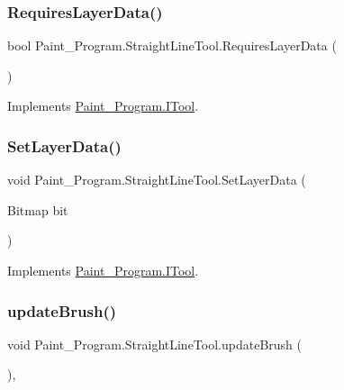 \subsubsection{\texorpdfstring{Requires\+Layer\+Data()}{RequiresLayerData()}}
{\footnotesize\ttfamily bool Paint\+\_\+\+Program.\+Straight\+Line\+Tool.\+Requires\+Layer\+Data (\begin{DoxyParamCaption}{ }\end{DoxyParamCaption})\hspace{0.3cm}{\ttfamily [inline]}}



Implements \mbox{\hyperlink{interface_paint___program_1_1_i_tool_a6d45b6c48da8130ae41db3a66cdaef9a}{Paint\+\_\+\+Program.\+I\+Tool}}.

\mbox{\label{class_paint___program_1_1_straight_line_tool_aaf03af3c789ac775fef1336c81c11a34}} 
\subsubsection{\texorpdfstring{Set\+Layer\+Data()}{SetLayerData()}}
{\footnotesize\ttfamily void Paint\+\_\+\+Program.\+Straight\+Line\+Tool.\+Set\+Layer\+Data (\begin{DoxyParamCaption}\item[{Bitmap}]{bit }\end{DoxyParamCaption})\hspace{0.3cm}{\ttfamily [inline]}}



Implements \mbox{\hyperlink{interface_paint___program_1_1_i_tool_a2d3e63715dfe04075d27dacf367d1633}{Paint\+\_\+\+Program.\+I\+Tool}}.

\mbox{\label{class_paint___program_1_1_straight_line_tool_a8069ecade0457152cb37ee7ea308f72d}} 
\subsubsection{\texorpdfstring{update\+Brush()}{updateBrush()}}
{\footnotesize\ttfamily void Paint\+\_\+\+Program.\+Straight\+Line\+Tool.\+update\+Brush (\begin{DoxyParamCaption}{ }\end{DoxyParamCaption})\hspace{0.3cm}{\ttfamily [inline]}, {\ttfamily [private]}}

